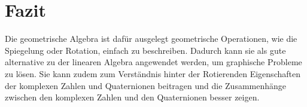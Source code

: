 %
%
%
\section{Fazit}

Die geometrische Algebra ist dafür ausgelegt geometrische Operationen, wie die Spiegelung oder Rotation, einfach zu beschreiben. Dadurch kann sie als gute alternative zu der linearen Algebra angewendet werden, um graphische Probleme zu lösen. Sie kann zudem zum Verständnis hinter der Rotierenden Eigenschaften der komplexen Zahlen und Quaternionen beitragen und die Zusammenhänge zwischen den komplexen Zahlen und den Quaternionen besser zeigen.